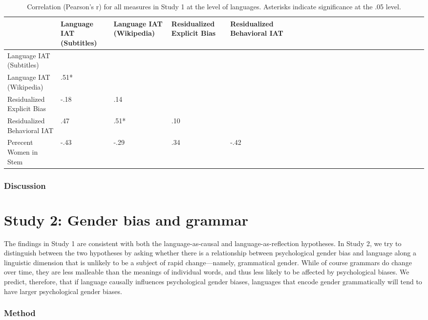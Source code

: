 \documentclass[man,floatsintext]{apa6}
\theoremstyle{definition}
\theoremstyle{definition}
\theoremstyle{definition}
\theoremstyle{remark}
\begin{document}
\begin{table}

\caption{\label{tab:corrtable}Correlation (Pearson's r) for all measures in Study 1 at the level of languages. Asterisks indicate significance at the .05 level.}
\centering
\fontsize{10}{12}\selectfont
\begin{tabular}[t]{l>{\raggedleft\arraybackslash}p{2.5cm}>{\raggedleft\arraybackslash}p{2.5cm}>{\raggedleft\arraybackslash}p{2.5cm}>{\raggedleft\arraybackslash}p{2.5cm}lrrrrlrrrrlrrrrlrrrr}
\toprule
 & Language IAT
(Subtitles) & Language IAT 
 (Wikipedia) & Residualized 
Explicit Bias & Residualized 
Behavioral IAT\\
\midrule
Language IAT (Subtitles) &  &  &  & \\
Language IAT (Wikipedia) & .51* &  &  & \\
Residualized Explicit Bias & -.18 & .14 &  & \\
Residualized Behavioral IAT & .47 & .51* & .10 & \\
Perecent Women in Stem & -.43 & -.29 & .34 & -.42\\
\bottomrule
\end{tabular}
\end{table}

\subsubsection{Discussion}\label{discussion}

\section{Study 2: Gender bias and
grammar}\label{study-2-gender-bias-and-grammar}

The findings in Study 1 are consistent with both the language-as-causal
and language-as-reflection hypotheses. In Study 2, we try to distinguish
between the two hypotheses by asking whether there is a relationship
between psychological gender bias and language along a linguistic
dimension that is unlikely to be a subject of rapid change---namely,
grammatical gender. While of course grammars do change over time, they
are less malleable than the meanings of individual words, and thus less
likely to be affected by psychological biases. We predict, therefore,
that if language causally influences psychological gender biases,
languages that encode gender grammatically will tend to have larger
psychological gender biases.

\subsubsection{Method}\label{method}
\end{document}
